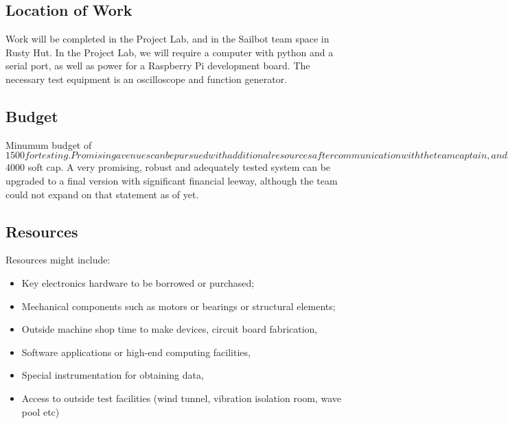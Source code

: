 \subsection{\label{sec:resources:location-of-work}Location of Work}
Work will be completed in the Project Lab, and in the Sailbot team space in Rusty Hut. In the Project Lab, we will require a computer with python and a serial port, as well as power for a Raspberry Pi development board. The necessary test equipment is an oscilloscope and function generator.

\subsection{\label{sec:resources:budget}Budget}
Minumum budget of $1500 for testing. Promising avenues can be pursued with additional resources after communication with the team captain, and the final system has a $4000 soft cap. A very promising, robust and adequately tested system can be upgraded to a final version with significant financial leeway, although the team could not expand on that statement as of yet. 

\subsection{\label{sec:resources:resources}Resources}
Resources might include:
\begin{itemize}
\item Key electronics hardware to be borrowed or purchased;
\item Mechanical components such as motors or bearings or structural elements;
\item Outside machine shop time to make devices, circuit board fabrication,
\item Software applications or high-end computing facilities,
\item Special instrumentation for obtaining data,
\item Access to outside test facilities (wind tunnel, vibration isolation room, wave pool etc)
\end{itemize}
